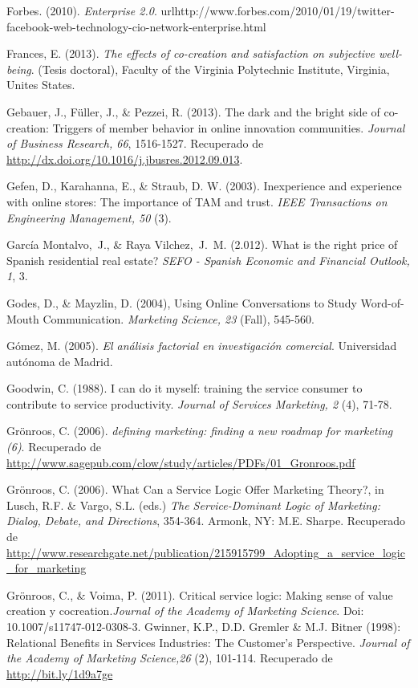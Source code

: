 \begin{thebibliography}{11}
	\bibitem{}
		Forbes. (2010).  \emph{Enterprise 2.0}. url{http://www.forbes.com/2010/01/19/twitter-facebook-web-technology-cio-network-enterprise.html} 

	\bibitem{}
		Frances, E. (2013). \emph{The effects of co-creation and satisfaction on subjective well-being}. (Tesis doctoral), Faculty of the Virginia Polytechnic Institute, Virginia, Unites States.  

	\bibitem{}
		Gebauer, J., Füller, J., \& Pezzei, R. (2013). The dark and the bright side of co-creation: Triggers of member behavior in online innovation communities.  \emph{Journal of Business Research, 66}, 1516-1527.  Recuperado de \url{http://dx.doi.org/10.1016/j.jbusres.2012.09.013}.	

	\bibitem{}
		Gefen, D., Karahanna, E., \& Straub, D. W. (2003). Inexperience and experience with online stores: The importance of TAM and trust.  \emph{IEEE Transactions on Engineering Management, 50} (3).

	\bibitem{}
		García Montalvo, J., \& Raya Vilchez, J. M. (2.012). What is the right price of Spanish residential real estate? \emph{SEFO - Spanish Economic and Financial Outlook, 1}, 3.	
	
	\bibitem{}
		Godes, D., \& Mayzlin, D. (2004), Using Online Conversations to Study Word-of-Mouth Communication.  \emph{Marketing Science, 23} (Fall), 545-560. 

	\bibitem{}
		Gómez, M. (2005). \emph{El análisis factorial en investigación comercial}. Universidad autónoma de Madrid.  

	\bibitem{}
		Goodwin, C. (1988). I can do it myself: training the service consumer to contribute to service productivity. \emph{Journal of Services Marketing, 2} (4), 71-78.

	\bibitem{}
		Grönroos, C. (2006).  \emph{defining marketing: finding a new roadmap for marketing (6)}. Recuperado de \url{http://www.sagepub.com/clow/study/articles/PDFs/01_Gronroos.pdf} 	

	\bibitem{}
		Grönroos, C. (2006). What Can a Service Logic Offer Marketing Theory?, in Lusch, R.F. \& Vargo, S.L. (eds.)  \emph{The Service-Dominant Logic of Marketing: Dialog, Debate, and Directions}, 354-364. Armonk, NY: M.E. Sharpe. Recuperado de \url{http://www.researchgate.net/publication/215915799_Adopting_a_service_logic_for_marketing}

	\bibitem{}
		Grönroos, C., \& Voima, P. (2011). Critical service logic: Making sense of value creation y cocreation.\emph{Journal of the Academy of Marketing Science}. Doi: 10.1007/s11747-012-0308-3.
	\bibitem{}
		Gwinner, K.P., D.D. Gremler \& M.J. Bitner (1998): Relational Benefits in Services Industries: The Customer’s Perspective. \emph{Journal of the Academy of Marketing Science,26} (2), 101-114. Recuperado de \url{http://bit.ly/1d9a7ge}


\end{thebibliography}
